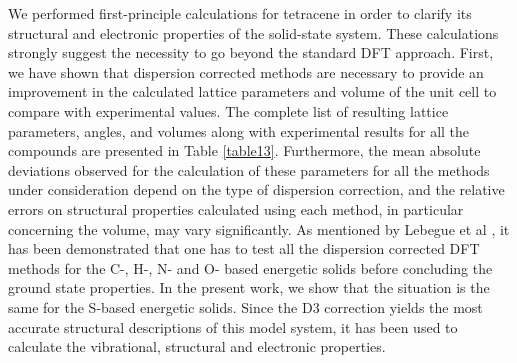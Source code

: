 We performed first-principle calculations for tetracene in order to clarify its structural and electronic properties of the solid-state system. These calculations strongly suggest the necessity to go beyond the standard DFT approach. First, we have shown that dispersion corrected methods are necessary to provide an improvement in the calculated lattice parameters and volume of the unit cell to compare with experimental values. The complete list of resulting lattice parameters, angles, and volumes along with experimental results for all the compounds are presented in Table \ref{table13}. Furthermore, the mean absolute deviations observed for the calculation of these parameters for all the methods under consideration depend on the type of dispersion correction, and the relative errors on structural properties calculated using each method, in particular concerning the volume, may vary significantly. As mentioned by Lebegue et al \cite{appalakondaiah2015dispersion}, it has been demonstrated that one has to test all the dispersion corrected DFT methods for the C-, H-, N- and O- based energetic solids before concluding the ground state properties. In the present work, we show that the situation is the same for the S-based energetic solids. Since the D3 correction yields the most accurate structural descriptions of this model system, it has been used to calculate the vibrational, structural and electronic properties.\\
 
